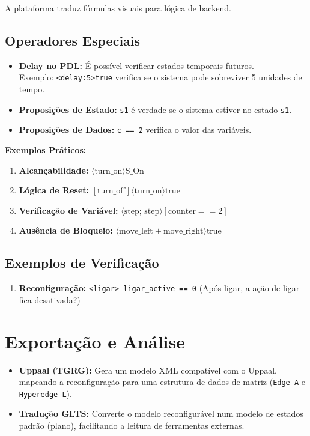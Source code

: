 \documentclass[a4paper,11pt]{article}
\begin{document}
A plataforma traduz fórmulas visuais para lógica de backend. 

\subsection{Operadores Especiais}
\begin{itemize}[noitemsep]
    \item \textbf{Delay no PDL:} É possível verificar estados temporais futuros. \\
    Exemplo: \texttt{<delay:5>true} verifica se o sistema pode sobreviver 5 unidades de tempo.
    \item \textbf{Proposições de Estado:} \texttt{s1} é verdade se o sistema estiver no estado \texttt{s1}.
    \item \textbf{Proposições de Dados:} \texttt{c == 2} verifica o valor das variáveis.
\end{itemize}

\textbf{Exemplos Práticos:}
\begin{enumerate}[label=\arabic*., noitemsep]
    \item \textbf{Alcançabilidade:} $\langle \text{turn\_on} \rangle \text{S\_On}$
    \item \textbf{Lógica de Reset:} $[ \text{turn\_off} ] \langle \text{turn\_on} \rangle \text{true}$
    \item \textbf{Verificação de Variável:} $\langle \text{step; step} \rangle [\text{counter} == 2]$
    \item \textbf{Ausência de Bloqueio:} $\langle \text{move\_left} + \text{move\_right} \rangle \text{true}$
\end{enumerate}

\subsection{Exemplos de Verificação}
\begin{enumerate}[label=\arabic*., noitemsep]
    \item \textbf{Reconfiguração:} \texttt{<ligar> ligar\_active == 0} (Após ligar, a ação de ligar fica desativada?)
\end{enumerate}

\section{Exportação e Análise}
\begin{itemize}
    \item \textbf{Uppaal (TGRG):} Gera um modelo XML compatível com o Uppaal, mapeando a reconfiguração para uma estrutura de dados de matriz (\texttt{Edge A} e \texttt{Hyperedge L}).
    \item \textbf{Tradução GLTS:} Converte o modelo reconfigurável num modelo de estados padrão (plano), facilitando a leitura de ferramentas externas.
\end{itemize}
\end{document}
